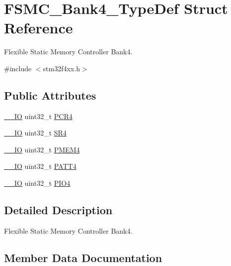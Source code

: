 \hypertarget{struct_f_s_m_c___bank4___type_def}{}\section{F\+S\+M\+C\+\_\+\+Bank4\+\_\+\+Type\+Def Struct Reference}
\label{struct_f_s_m_c___bank4___type_def}


Flexible Static Memory Controller Bank4.  




{\ttfamily \#include $<$stm32f4xx.\+h$>$}

\subsection*{Public Attributes}
\begin{DoxyCompactItemize}
\item 
\hyperlink{core__cm4_8h_aec43007d9998a0a0e01faede4133d6be}{\+\_\+\+\_\+\+IO} uint32\+\_\+t \hyperlink{struct_f_s_m_c___bank4___type_def_a0470b5bbb53e9f1bbde09829371eb72f}{P\+C\+R4}
\item 
\hyperlink{core__cm4_8h_aec43007d9998a0a0e01faede4133d6be}{\+\_\+\+\_\+\+IO} uint32\+\_\+t \hyperlink{struct_f_s_m_c___bank4___type_def_a1e0f09be7fa48bb7b14233866da1dd9f}{S\+R4}
\item 
\hyperlink{core__cm4_8h_aec43007d9998a0a0e01faede4133d6be}{\+\_\+\+\_\+\+IO} uint32\+\_\+t \hyperlink{struct_f_s_m_c___bank4___type_def_a4ed4ce751e7a8b3207bd20675b1d9085}{P\+M\+E\+M4}
\item 
\hyperlink{core__cm4_8h_aec43007d9998a0a0e01faede4133d6be}{\+\_\+\+\_\+\+IO} uint32\+\_\+t \hyperlink{struct_f_s_m_c___bank4___type_def_a4cccc7802b573135311cc38e7f247ff5}{P\+A\+T\+T4}
\item 
\hyperlink{core__cm4_8h_aec43007d9998a0a0e01faede4133d6be}{\+\_\+\+\_\+\+IO} uint32\+\_\+t \hyperlink{struct_f_s_m_c___bank4___type_def_a531ebc38c47bebfb198eafb4de24cb2a}{P\+I\+O4}
\end{DoxyCompactItemize}


\subsection{Detailed Description}
Flexible Static Memory Controller Bank4. 

\subsection{Member Data Documentation}
